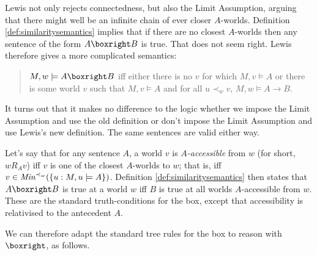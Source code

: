 Lewis not only rejects connectedness, but also the Limit Assumption, arguing
that there might well be an infinite chain of ever closer $A$-worlds. Definition
\ref{def:similaritysemantics} implies that if there are no closest $A$-worlds
then any sentence of the form $A \boxright B$ is true. That does not seem right.
Lewis therefore gives a more complicated semantics:

\begin{quote}
  $M,w \models A \boxright B$ iff either there is no $v$ for
  which $M,v\models A$ or there is some world $v$ such that
  $M,v\models A$ and for all $u \prec_w v$, $M,w \models A \to B$.
\end{quote}
%
It turns out that it makes no difference to the logic whether we impose the
Limit Assumption and use the old definition or don't impose the Limit Assumption
and use Lewis's new definition. The same sentences are valid either
way. %


\iffalse

Let's say that for any sentence $A$, a world $v$ is \emph{$A$-accessible} from
$w$ (for short, $wR_Av$) iff $v$ is one of the closest $A$-worlds to $w$; that
is, iff $v \in \emph{Min}^{\prec_w}(\{u: M,u \models A\})$. Definition
\ref{def:similaritysemantics} then states that $A \boxright B$ is true at a
world $w$ iff $B$ is true at all worlds $A$-accessible from $w$. These are the
standard truth-conditions for the box, except that accessibility is relativised
to the antecedent $A$.

We can therefore adapt the standard tree rules for the box to reason with
$\boxright$, as follows.

\bigskip
\begin{center}
\begin{minipage}{0.4\textwidth} \centering
{}
\end{minipage}
\begin{minipage}{0.4\textwidth}\centering
{}
\end{minipage}
\end{center}
\bigskip

